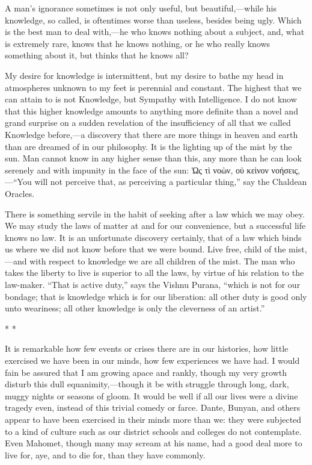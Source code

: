 \documentclass[twoside,openright,10pt]{memoir} %
\begin{document}
A man’s ignorance sometimes is not only useful, but beautiful,—while his knowledge, so called, is oftentimes worse than useless, besides being ugly. Which is the best man to deal with,—he who knows nothing about a subject, and, what is extremely rare, knows that he knows nothing, or he who really knows something about it, but thinks that he knows all?

My desire for knowledge is intermittent, but my desire to bathe my head in atmospheres unknown to my feet is perennial and constant. The highest that we can attain to is not Knowledge, but Sympathy with Intelligence. I do not know that this higher knowledge amounts to anything more definite than a novel and grand surprise on a sudden revelation of the insufficiency of all that we called Knowledge before,—a discovery that there are more things in heaven and earth than are dreamed of in our philosophy. It is the lighting up of the mist by the sun. Man cannot know in any higher sense than this, any more than he can look serenely and with impunity in the face of the sun: \EBGaramond Ὡς τὶ νοὼν, οὐ κεὶνον νοήσεις\normalfont ,—“You will not perceive that, as perceiving a particular thing,” say the Chaldean Oracles.

There is something servile in the habit of seeking after a law which we may obey. We may study the laws of matter at and for our convenience, but a successful life knows no law. It is an unfortunate discovery certainly, that of a law which binds us where we did not know before that we were bound. Live free, child of the mist,—and with respect to knowledge we are all children of the mist. The man who takes the liberty to live is superior to all the laws, by virtue of his relation to the law-maker. “That is active duty,” says the Vishnu Purana, “which is not for our bondage; that is knowledge which is for our liberation: all other duty is good only unto weariness; all other knowledge is only the cleverness of an artist.”
\begin{center}\tiny * * * \normalsize \end{center}
It is remarkable how few events or crises there are in our histories, how little exercised we have been in our minds, how few experiences we have had. I would fain be assured that I am growing apace and rankly, though my very growth disturb this dull equanimity,—though it be with struggle through long, dark, muggy nights or seasons of gloom. It would be well if all our lives were a divine tragedy even, instead of this trivial comedy or farce. Dante, Bunyan, and others appear to have been exercised in their minds more than we: they were subjected to a kind of culture such as our district schools and colleges do not contemplate. Even Mahomet, though many may scream at his name, had a good deal more to live for, aye, and to die for, than they have commonly.
\end{document}
